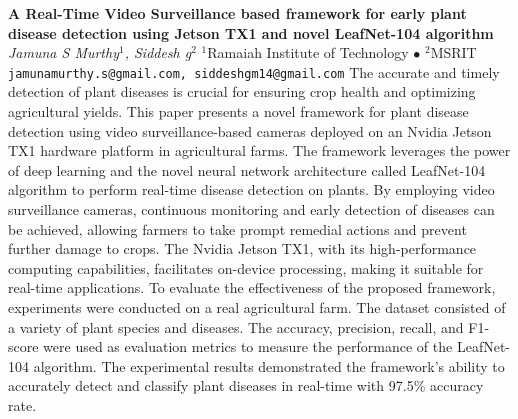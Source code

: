 
    \begin{conf-abstract}[]
        {\textbf{A Real-Time Video Surveillance based framework for early plant disease detection using Jetson TX1 and novel LeafNet-104 algorithm}}
        {\textit{Jamuna S Murthy$^{1}$, Siddesh g$^{2}$}}
        {$^{1}$Ramaiah Institute of Technology $\bullet$ $^{2}$MSRIT}
        {\texttt{jamunamurthy.s@gmail.com, siddeshgm14@gmail.com}}
        {The accurate and timely detection of plant diseases is crucial for ensuring crop health and optimizing agricultural yields. This paper presents a novel framework for plant disease detection using video surveillance-based cameras deployed on an Nvidia Jetson TX1 hardware platform in agricultural farms. The framework leverages the power of deep learning and the novel neural network architecture called LeafNet-104 algorithm to perform real-time disease detection on plants. By employing video surveillance cameras, continuous monitoring and early detection of diseases can be achieved, allowing farmers to take prompt remedial actions and prevent further damage to crops. The Nvidia Jetson TX1, with its high-performance computing capabilities, facilitates on-device processing, making it suitable for real-time applications. To evaluate the effectiveness of the proposed framework, experiments were conducted on a real agricultural farm. The dataset consisted of a variety of plant species and diseases. The accuracy, precision, recall, and F1-score were used as evaluation metrics to measure the performance of the LeafNet-104 algorithm. The experimental results demonstrated the framework's ability to accurately detect and classify plant diseases in real-time with 97.5\% accuracy rate.}
    \end{conf-abstract}
        